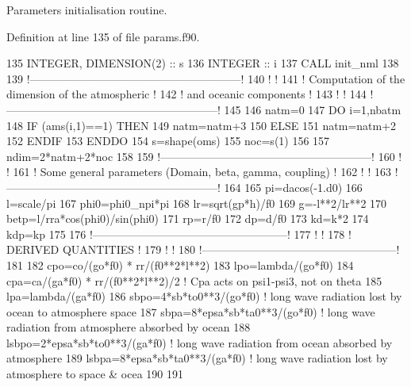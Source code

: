 Parameters initialisation routine. 



Definition at line 135 of file params.\+f90.


\begin{DoxyCode}
135     \textcolor{keywordtype}{INTEGER}, \textcolor{keywordtype}{DIMENSION(2)} :: s
136     \textcolor{keywordtype}{INTEGER} :: i
137     \textcolor{keyword}{CALL }init\_nml
138 
139     \textcolor{comment}{!---------------------------------------------------------!}
140     \textcolor{comment}{!                                                         !}
141     \textcolor{comment}{! Computation of the dimension of the atmospheric         !}
142     \textcolor{comment}{! and oceanic components                                  !}
143     \textcolor{comment}{!                                                         !}
144     \textcolor{comment}{!---------------------------------------------------------!}
145 
146     natm=0
147     \textcolor{keywordflow}{DO} i=1,nbatm
148        \textcolor{keywordflow}{IF} (ams(i,1)==1) \textcolor{keywordflow}{THEN}
149           natm=natm+3
150        \textcolor{keywordflow}{ELSE}
151           natm=natm+2
152 \textcolor{keywordflow}{       ENDIF}
153 \textcolor{keywordflow}{    ENDDO}
154     s=shape(oms)
155     noc=s(1)
156 
157     ndim=2*natm+2*noc
158 
159     \textcolor{comment}{!---------------------------------------------------------!}
160     \textcolor{comment}{!                                                         !}
161     \textcolor{comment}{! Some general parameters (Domain, beta, gamma, coupling) !}
162     \textcolor{comment}{!                                                         !}
163     \textcolor{comment}{!---------------------------------------------------------!}
164 
165     pi=dacos(-1.d0)
166     l=scale/pi
167     phi0=phi0\_npi*pi
168     lr=sqrt(gp*h)/f0
169     g=-l**2/lr**2
170     betp=l/rra*cos(phi0)/sin(phi0)
171     rp=r/f0
172     dp=d/f0
173     kd=k*2
174     kdp=kp
175 
176     \textcolor{comment}{!-----------------------------------------------------!}
177     \textcolor{comment}{!                                                     !}
178     \textcolor{comment}{! DERIVED QUANTITIES                                  !}
179     \textcolor{comment}{!                                                     !}
180     \textcolor{comment}{!-----------------------------------------------------!}
181 
182     cpo=co/(go*f0) * rr/(f0**2*l**2)
183     lpo=lambda/(go*f0)
184     cpa=ca/(ga*f0) * rr/(f0**2*l**2)/2 \textcolor{comment}{! Cpa acts on psi1-psi3, not on theta}
185     lpa=lambda/(ga*f0)
186     sbpo=4*sb*to0**3/(go*f0) \textcolor{comment}{! long wave radiation lost by ocean to atmosphere space}
187     sbpa=8*epsa*sb*ta0**3/(go*f0) \textcolor{comment}{! long wave radiation from atmosphere absorbed by ocean}
188     lsbpo=2*epsa*sb*to0**3/(ga*f0) \textcolor{comment}{! long wave radiation from ocean absorbed by atmosphere}
189     lsbpa=8*epsa*sb*ta0**3/(ga*f0) \textcolor{comment}{! long wave radiation lost by atmosphere to space & ocea}
190 
191 
\end{DoxyCode}


